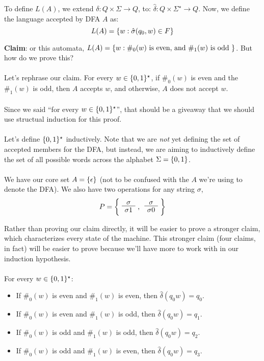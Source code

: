 \documentclass[]{article}
\DeclarePairedDelimiter{\set}{\lbrace}{\rbrace}
\theoremstyle{definition}
\begin{document}
      To define $L(A)$, we extend $\delta: Q \times \Sigma \to Q$, to: $\hat{\delta}: Q \times \Sigma^\star \to Q$. Now, we define the language accepted by DFA $A$ as:
      $$
        L(A) = \set{ w : \hat{\sigma}(q_0, w) \in F }
      $$

      \textbf{Claim}: or this automata, $L(A) = \set{ w : \#_0(w) \text{ is even, and } \#_1(w) \text{ is odd }}$. But how do we prove this?
      \\ \\
      Let's rephrase our claim. For every $w \in \set{0, 1}^\star$, if $\#_0(w)$ is even and the $\#_1(w)$ is odd, then $A$ accepts $w$, and otherwise, $A$ does not accept $w$.
      \\ \\
      Since we said ``for every $w \in \set{0, 1}^\star$'', that should be a giveaway that we should use structual induction for this proof.
      \\ \\
      Let's define $\set{0, 1}^\star$ inductively. Note that we are \emph{not} yet defining the set of accepted members for the DFA, but instead, we are aiming to inductively define the set of all possible words across the alphabet $\Sigma = \set{0, 1}$.
      \\ \\
      We have our core set $A = \set{ \epsilon }$ (not to be confused with the $A$ we're using to denote the DFA). We also have two operations for any string $\sigma$,
      $$
        P = \bigg\{ \text{\AxiomC{$\sigma$} \UnaryInfC{$\sigma 1$} \DisplayProof, \AxiomC{$\sigma$} \UnaryInfC{$\sigma 0$} \DisplayProof} \bigg\}
      $$

      Rather than proving our claim directly, it will be easier to prove a stronger claim, which characterizes every state of the machine. This stronger claim (four claims, in fact) will be easier to prove because we'll have more to work with in our induction hypothesis.
      \\ \\
      For every $w \in \set{0, 1}^\star$:

      \begin{itemize}
        \item If $\#_0(w)$ is even and $\#_1(w)$ is even, then $\hat{\delta}(q_0 w) = q_0$.
        \item If $\#_0(w)$ is even and $\#_1(w)$ is odd, then $\hat{\delta}(q_0 w) = q_1$.
        \item If $\#_0(w)$ is odd and $\#_1(w)$ is odd, then $\hat{\delta}(q_0 w) = q_2$.
        \item If $\#_0(w)$ is odd and $\#_1(w)$ is even, then $\hat{\delta}(q_0 w) = q_3$.
      \end{itemize}
\end{document}
